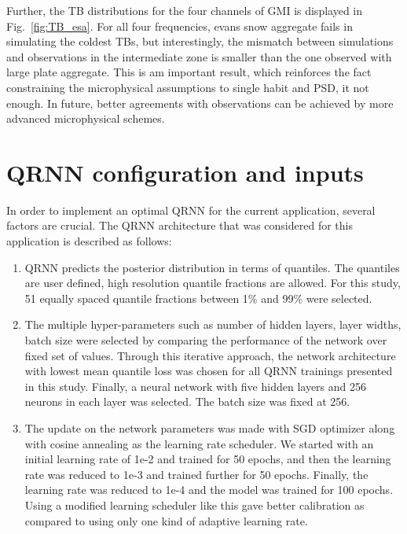 \documentclass[amt, manuscript]{copernicus}
\begin{document}
Further, the TB distributions for the four channels of GMI is displayed in Fig.~\ref{fig:TB_esa}. For all four frequencies, evans snow aggregate fails in simulating the coldest TBs, but interestingly, the mismatch between simulations and observations in the intermediate zone is smaller than the one observed with large plate aggregate. This is am important result, which reinforces the fact constraining the microphysical assumptions to single habit and PSD, it not enough. In future, better agreements with observations can be achieved by more advanced microphysical schemes.  


\section{QRNN configuration and inputs}
%
\label{app:qrnn_conf}
In order to implement an optimal QRNN for the current application, several factors are crucial. The QRNN architecture that was considered for this application is described as follows:

\begin{enumerate}	
	
	\item QRNN predicts the posterior distribution in terms of quantiles. The quantiles are user defined, high resolution quantile fractions are allowed. For this study, 51 equally spaced quantile fractions between 1\% and 99\% were selected. 	
	
	\item The multiple hyper-parameters such as number of hidden layers, layer widths, batch size were selected by comparing the performance of the network over fixed set of values. Through this iterative approach, the network architecture with lowest mean quantile loss was chosen for all QRNN trainings presented in this study. Finally, a neural network with five hidden layers and 256 neurons in each layer was selected. The batch size was fixed at 256. 
	
	\item The update on the network parameters was made with SGD optimizer along with cosine annealing as the learning rate scheduler. We started with an initial learning rate of 1e-2 and trained for 50 epochs, and then the learning rate was reduced to 1e-3 and trained further for 50 epochs. Finally, the learning rate was reduced to 1e-4 and the model was trained for 100 epochs.
	Using a modified learning scheduler like this gave better calibration as compared to using only one kind of adaptive learning rate.
	
\end{enumerate}
\end{document}
